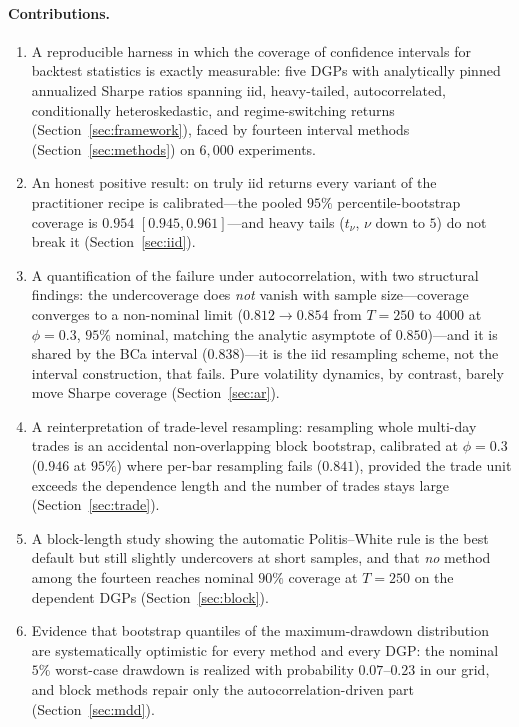 \documentclass[11pt]{article}
\begin{document}
\paragraph{Contributions.}
\begin{enumerate}\itemsep2pt
\item A reproducible harness in which the coverage of confidence intervals for
backtest statistics is exactly measurable: five DGPs with analytically pinned
annualized Sharpe ratios spanning iid, heavy-tailed, autocorrelated,
conditionally heteroskedastic, and regime-switching returns
(Section~\ref{sec:framework}), faced by fourteen interval methods
(Section~\ref{sec:methods}) on $6{,}000$ experiments.
\item An honest positive result: on truly iid returns every variant of the
practitioner recipe is calibrated---the pooled $95\%$ percentile-bootstrap
coverage is $0.954$ $[0.945,0.961]$---and heavy tails ($t_\nu$, $\nu$ down to
$5$) do not break it (Section~\ref{sec:iid}).
\item A quantification of the failure under autocorrelation, with two
structural findings: the undercoverage does \emph{not} vanish with sample
size---coverage converges to a non-nominal limit ($0.812\to0.854$ from
$T=250$ to $4000$ at $\phi=0.3$, $95\%$ nominal, matching the analytic
asymptote of $0.850$)---and it is shared by the BCa interval ($0.838$)---it is the iid resampling
scheme, not the interval construction, that fails. Pure volatility dynamics,
by contrast, barely move Sharpe coverage (Section~\ref{sec:ar}).
\item A reinterpretation of trade-level resampling: resampling whole multi-day
trades is an accidental non-overlapping block bootstrap, calibrated at
$\phi=0.3$ ($0.946$ at $95\%$) where per-bar resampling fails ($0.841$),
provided the trade unit exceeds the dependence length and the number of trades
stays large (Section~\ref{sec:trade}).
\item A block-length study showing the automatic Politis--White rule is the
best default but still slightly undercovers at short samples, and that
\emph{no} method among the fourteen reaches nominal $90\%$ coverage at $T=250$
on the dependent DGPs (Section~\ref{sec:block}).
\item Evidence that bootstrap quantiles of the maximum-drawdown distribution
are systematically optimistic for every method and every DGP: the nominal
$5\%$ worst-case drawdown is realized with probability $0.07$--$0.23$ in our
grid, and block methods repair only the autocorrelation-driven part
(Section~\ref{sec:mdd}).
\end{enumerate}
\end{document}
